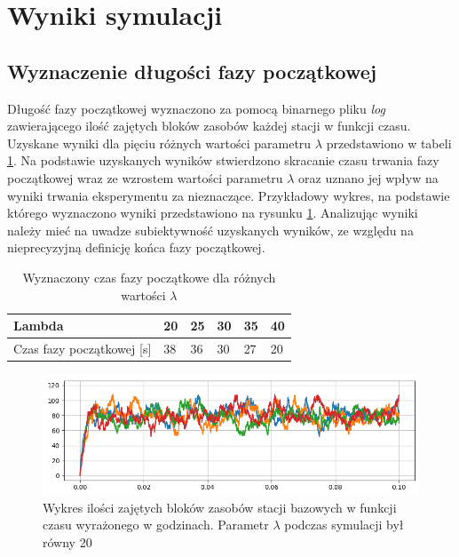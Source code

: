 \newpage
\section{Wyniki symulacji} \label{initial_phase_section}
\subsection{Wyznaczenie długości fazy początkowej}
Długość fazy początkowej wyznaczono za pomocą binarnego pliku \emph{log} zawierającego ilość zajętych bloków zasobów każdej stacji w funkcji czasu. Uzyskane wyniki dla pięciu różnych wartości parametru $\lambda$ przedstawiono w tabeli \ref{initial_phase_table}. Na podstawie uzyskanych wyników stwierdzono skracanie czasu trwania fazy początkowej wraz ze wzrostem wartości parametru $\lambda$ oraz uznano jej wpływ na wyniki trwania eksperymentu za nieznaczące. Przykładowy wykres, na podstawie którego wyznaczono wyniki przedstawiono na rysunku \ref{initial_phase_lambda_20}. Analizując wyniki należy mieć na uwadze subiektywność uzyskanych wyników, ze względu na nieprecyzyjną definicję końca fazy początkowej.

\begin{table}[h]
\caption{Wyznaczony czas fazy początkowe dla różnych wartości $\lambda$}
\label{initial_phase_table}
\begin{center}
\renewcommand{\arraystretch}{1.5}
\begin{tabular}{|l|l|l|l|l|l|}
\hline 
Lambda & 20 & 25 & 30 & 35 & 40 \\ 
\hline 
Czas fazy początkowej [s] & 38 & 36 & 30 & 27 & 20 \\ 
\hline
\end{tabular}
\end{center}
\end{table}

\begin{figure}[h]
\center
\includegraphics[scale=0.65]{img/initial_phase_lambda_20.png} 
\caption{Wykres ilości zajętych bloków zasobów stacji bazowych w funkcji czasu wyrażonego w godzinach. Parametr $\lambda$ podczas symulacji był równy 20}
\label{initial_phase_lambda_20}
\end{figure}

